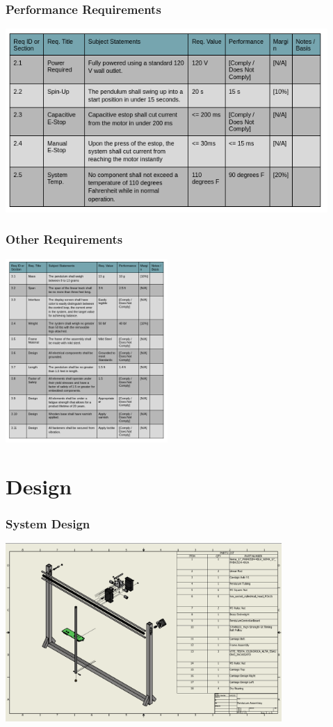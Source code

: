 \documentclass[aspectratio=169]{beamer}
\begin{document}
\begin{frame}
    \frametitle{Performance Requirements}

    \includegraphics[height=7cm]{Performance}
\end{frame}


\begin{frame}
    \frametitle{Other Requirements}

    \includegraphics[height=7cm]{OtherReqs}
\end{frame}


\section{Design}
\begin{frame}
    \frametitle{System Design}

    \includegraphics[width=10.5cm]{exploded}

\end{frame}
\end{document}
